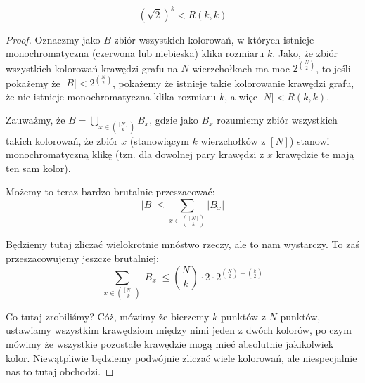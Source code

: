 \begin{theorem}
	\begin{equation}
		(\sqrt{2})^{k} < R(k,k)
	\end{equation}
\end{theorem}

\begin{proof}
	Oznaczmy jako \(B\) zbiór wszystkich kolorowań, w których istnieje monochromatyczna (czerwona lub niebieska) klika rozmiaru \(k\). Jako, że zbiór wszystkich kolorowań krawędzi grafu na \(N\) wierzchołkach ma moc \(2^{\binom{N}{2}}\), to jeśli pokażemy że \(|B| < 2^{\binom{N}{2}}\), pokażemy że istnieje takie kolorowanie krawędzi grafu, że nie istnieje monochromatyczna klika rozmiaru \(k\), a więc \(|N| < R(k,k)\).

	Zauważmy, że \( B = \bigcup_{x \in \binom{[N]}{k}} B_x \), gdzie jako \(B_x\) rozumiemy zbiór wszystkich takich kolorowań, że zbiór \(x\) (stanowiącym \(k\) wierzchołków z \([N]\)) stanowi monochromatyczną klikę (tzn. dla dowolnej pary krawędzi z \(x\) krawędzie te mają ten sam kolor).

	Możemy to teraz bardzo brutalnie przeszacować:
	\begin{equation*}
		|B| \leq \sum_{x \in \binom{[N]}{k}} |B_x|
	\end{equation*}

	Będziemy tutaj zliczać wielokrotnie mnóstwo rzeczy, ale to nam wystarczy. To zaś przeszacowujemy jeszcze brutalniej:
	\begin{equation*}
		\sum_{x \in \binom{[N]}{k}} |B_x| \leq \binom{N}{k} \cdot 2 \cdot 2^{\binom{N}{2} - \binom{k}{2}}
	\end{equation*}

	Co tutaj zrobiliśmy? Cóż, mówimy że bierzemy \(k\) punktów z \(N\) punktów, ustawiamy wszystkim krawędziom między nimi jeden z dwóch kolorów, po czym mówimy że wszystkie pozostałe krawędzie mogą mieć absolutnie jakikolwiek kolor. Niewątpliwie będziemy podwójnie zliczać wiele kolorowań, ale niespecjalnie nas to tutaj obchodzi.


\end{proof}
